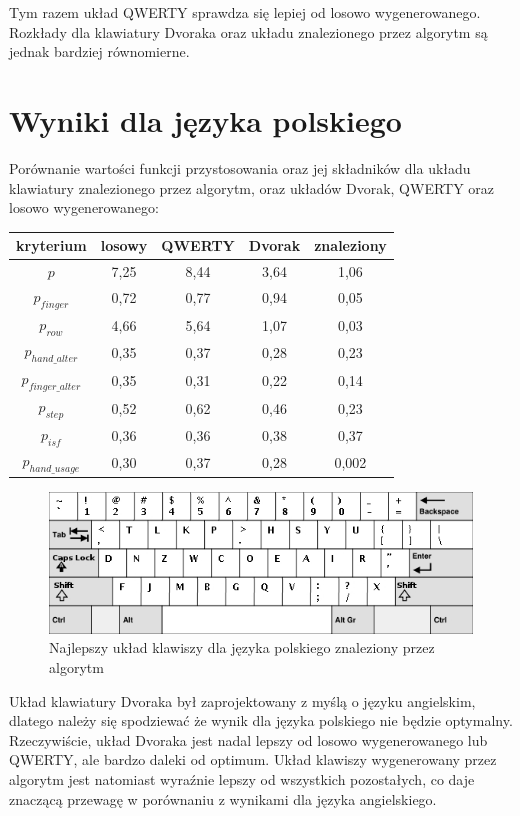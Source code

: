 \documentclass[brudnopis]{xmgr}
\begin{document}
Tym razem układ QWERTY sprawdza się lepiej od losowo wygenerowanego. Rozkłady dla klawiatury Dvoraka oraz układu znalezionego przez algorytm są jednak bardziej równomierne.


\section{Wyniki dla języka polskiego}

Porównanie wartości funkcji przystosowania oraz jej składników dla układu klawiatury znalezionego przez algorytm, oraz układów Dvorak, QWERTY oraz losowo wygenerowanego:\newline
\begin{tabular}{ c | c | c | c | c}
  kryterium         & losowy & QWERTY & Dvorak & znaleziony \\
  \hline
  $p$			& 7,25 & 8,44 & 3,64 & 1,06 \\
  \hline
  $p_{finger}$          & 0,72 & 0,77 & 0,94 & 0,05 \\
  $p_{row}$             & 4,66 & 5,64 & 1,07 & 0,03 \\
  $p_{hand\_alter}$     & 0,35 & 0,37 & 0,28 & 0,23 \\
  $p_{finger\_alter}$   & 0,35 & 0,31 & 0,22 & 0,14 \\
  $p_{step}$            & 0,52 & 0,62 & 0,46 & 0,23 \\
  $p_{isf}$             & 0,36 & 0,36 & 0,38 & 0,37 \\
  $p_{hand\_usage}$     & 0,30 & 0,37 & 0,28 & 0,002 \\
\end{tabular}\newline\newline

\begin{figure}[!tbh]
\centering
\includegraphics[width=.8\hsize]{fig/best_pl}
\caption{Najlepszy układ klawiszy dla języka polskiego znaleziony przez algorytm}
\end{figure}

Układ klawiatury Dvoraka był zaprojektowany z myślą o języku angielskim, dlatego należy się spodziewać że wynik dla języka polskiego nie będzie optymalny. Rzeczywiście, układ Dvoraka jest nadal lepszy od losowo wygenerowanego lub QWERTY, ale bardzo daleki od optimum. Układ klawiszy wygenerowany przez algorytm jest natomiast wyraźnie lepszy od wszystkich pozostałych, co daje znaczącą przewagę w porównaniu z wynikami dla języka angielskiego.
\end{document}
